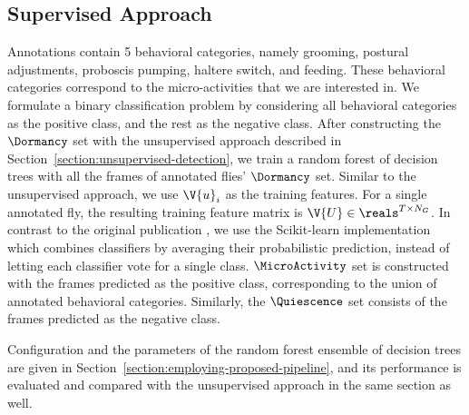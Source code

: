 \subsection{Supervised Approach}\label{section:supervised-detection}
Annotations contain 5 behavioral categories, namely grooming, postural adjustments, proboscis pumping, haltere switch, and feeding.
These behavioral categories correspond to the micro-activities that we are interested in.
We formulate a binary classification problem by considering all behavioral categories as the positive class, and the rest as the negative class.
After constructing the $\Dormancy$ set with the unsupervised approach described in Section~\ref{section:unsupervised-detection}, we train a random forest of decision trees \citep{breiman_random_2001} with all the frames of annotated flies' $\Dormancy$ set.
Similar to the unsupervised approach, we use $\V{u}_i$ as the training features.
For a single annotated fly, the resulting training feature matrix is $\V{U} \in \reals^{T \times N_G}$.
In contrast to the original publication \citep{breiman_random_2001}, we use the Scikit-learn \citep{pedregosa_scikit-learn_2011} implementation which combines classifiers by averaging their probabilistic prediction, instead of letting each classifier vote for a single class.
$\MicroActivity$ set is constructed with the frames predicted as the positive class, corresponding to the union of annotated behavioral categories. Similarly, the $\Quiescence$ set consists of the frames predicted as the negative class.

Configuration and the parameters of the random forest ensemble of decision trees are given in Section~\ref{section:employing-proposed-pipeline}, and its performance is evaluated and compared with the unsupervised approach in the same section as well.
